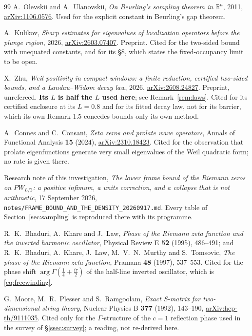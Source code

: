 \begin{thebibliography}{99}
A.~Olevskii and A.~Ulanovskii, \emph{On Beurling's sampling theorem in
$\mathbb R^n$}, 2011, \href{https://arxiv.org/abs/1106.0576}{arXiv:1106.0576}.
Used for the explicit constant in Beurling's gap theorem.

A.~Kulikov, \emph{Sharp estimates for eigenvalues of localization operators
before the plunge region}, 2026,
\href{https://arxiv.org/abs/2603.07407}{arXiv:2603.07407}. Preprint. Cited for
the two-sided bound with unequated constants, and for its \S8, which states the
fixed-occupancy limit to be open.

X.~Zhu, \emph{Weil positivity in compact windows: a finite reduction, certified
two-sided bounds, and a Landau--Widom decay law}, 2026,
\href{https://arxiv.org/abs/2608.24827}{arXiv:2608.24827}. Preprint,
unrefereed. \textbf{Its $L$ is half the $L$ used here}; see
Remark~\ref{rem:laws}. Cited for its certified enclosure at its $L=0.8$ and for
its fitted decay law, not for its barrier, which its own Remark 1.5 concedes
bounds only its own method.

A.~Connes and C.~Consani, \emph{Zeta zeros and prolate wave operators}, Annals of
Functional Analysis \textbf{15} (2024),
\href{https://arxiv.org/abs/2310.18423}{arXiv:2310.18423}. Cited for the
observation that prolate eigenfunctions generate very small eigenvalues of the
Weil quadratic form; no rate is given there.

Research note of this investigation, \emph{The lower frame bound of the Riemann
zeros on $PW_{L/2}$: a positive infimum, a units correction, and a collapse that
is not arithmetic}, 17 September 2026,
\texttt{notes/FRAME\_BOUND\_AND\_THE\_DENSITY\_20260917.md}. Every table of
Section~\ref{sec:sampling} is reproduced there with its programme.

R.~K.~Bhaduri, A.~Khare and J.~Law, \emph{Phase of the Riemann zeta function and
the inverted harmonic oscillator}, Physical Review E \textbf{52} (1995),
486--491; and R.~K.~Bhaduri, A.~Khare, J.~Law, M.~V.~N.~Murthy and S.~Tomsovic,
\emph{The phase of the Riemann zeta function}, Pramana \textbf{48} (1997),
537--553. Cited for the phase shift $\arg\Gamma(\frac14+\frac{i\tau}2)$ of the
half-line inverted oscillator, which is \eqref{eq:freewinding}.

G.~Moore, M.~R.~Plesser and S.~Ramgoolam, \emph{Exact S-matrix for
two-dimensional string theory}, Nuclear Physics B \textbf{377} (1992), 143--190,
\href{https://arxiv.org/abs/hep-th/9111035}{arXiv:hep-th/9111035}. Cited only for
the $\Gamma$-structure of the $c=1$ reflection phase used in the survey of
\S\ref{ssec:survey}; a reading, not re-derived here.


\end{thebibliography}
